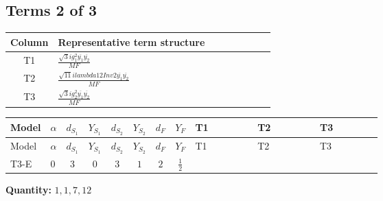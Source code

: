 \documentclass[8pt]{article}
\begin{document}
\begin{landscape}
\subsection*{Terms 2 of 3}
\begin{center}
\begin{tabular}{@{}c >{\raggedright\arraybackslash}p{0.82\linewidth}@{}}
\toprule
Column & Representative term structure \\
\midrule
T1 & \(\displaystyle \frac{\sqrt{3} i g_{1}^{2} \overline{y_{1}} \overline{y_{2}}}{MF}\) \\
\midrule
T2 & \(\displaystyle \frac{\sqrt{11} i lambda12Inv2 \overline{y_{1}} \overline{y_{2}}}{MF}\) \\
\midrule
T3 & \(\displaystyle \frac{\sqrt{3} i g_{2}^{2} \overline{y_{1}} \overline{y_{2}}}{MF}\) \\
\midrule
\bottomrule
\end{tabular}
\end{center}
\smallskip
\tiny
\begin{longtable}{@{}llcccccc >{\raggedright\arraybackslash}p{0.21\linewidth} >{\raggedright\arraybackslash}p{0.21\linewidth} >{\raggedright\arraybackslash}p{0.21\linewidth}@{}}
\toprule
Model & $\alpha$ & $d_{S_1}$ & $Y_{S_1}$ & $d_{S_2}$ & $Y_{S_2}$ & $d_F$ & $Y_F$ & T1 & T2 & T3 \\
\midrule
\endfirsthead
\toprule
Model & $\alpha$ & $d_{S_1}$ & $Y_{S_1}$ & $d_{S_2}$ & $Y_{S_2}$ & $d_F$ & $Y_F$ & T1 & T2 & T3 \\
\midrule
\endhead
T3-E & $0$ & $3$ & $0$ & $3$ & $1$ & $2$ & $\frac{1}{2}$ & \scriptsize\adjustbox{max width=\linewidth}{$\begin{gathered} \frac{\sqrt{3} i g_{1}^{2} \overline{y_{1}} \overline{y_{2}}}{8 MF}\end{gathered}$} & \scriptsize\adjustbox{max width=\linewidth}{$\begin{gathered} \frac{3 \sqrt{11} i lambda12Inv2 \overline{y_{1}} \overline{y_{2}}}{22 MF}\end{gathered}$} & \scriptsize\adjustbox{max width=\linewidth}{$\begin{gathered} \frac{49 \sqrt{3} i g_{2}^{2} \overline{y_{1}} \overline{y_{2}}}{24 MF}\end{gathered}$} \\
\midrule
\bottomrule
\end{longtable}
\clearpage
\noindent\textbf{Quantity: }$\mathrm{1,1,7,12}$\par\smallskip

\end{landscape}
\end{document}
